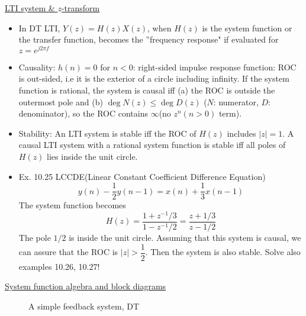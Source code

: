 \documentclass{article}
\begin{document}
\underline{LTI system \& $z$-transform}
\begin{itemize}
    \item In DT LTI, $Y(z)=H(z)X(z)$, when $H(z)$ is the system function or the transfer function, becomes the ''frequency response" if evaluated for $z=e^{j2\pi f}$
    \item Causality: $h(n)=0$ for $n < 0$: right-sided impulse response function: ROC is out-sided, i.e it is the exterior of a circle including infinity. If the system function is rational, the system is causal iff (a) the ROC is outside the outermost pole and (b) $\deg{N(z)} \le \deg{D(z)}$ ($N$: numerator, $D$: denominator), so the ROC contains $\infty$(no $z^n(n>0)$ term).
    \item Stability: An LTI system is stable iff the ROC of $H(z)$ includes $|z|=1$. A causal LTI system with a rational system function is stable iff all poles of $H(z)$ lies inside the unit circle.
    \item Ex. 10.25 LCCDE(Linear Constant Coefficient Difference Equation)
    \[y(n)-\frac{1}{2}y(n-1)=x(n)+\frac{1}{3}x(n-1)\]
    The system function becomes
    \[H(z)=\frac{1+z^{-1}/3}{1-z^{-1}/2}=\frac{z+1/3}{z-1/2}\]
    The pole $1/2$ is inside the unit circle. Assuming that this system is causal, we can assure that the ROC is $|z|>\dfrac{1}{2}$. Then the system is also stable. Solve also examples 10.26, 10.27!
\end{itemize}
\underline{System function algebra and block diagrams}
\begin{figure}[htb]
\centering
{}
\caption{A simple feedback system, DT}
\end{figure}
\end{document}
